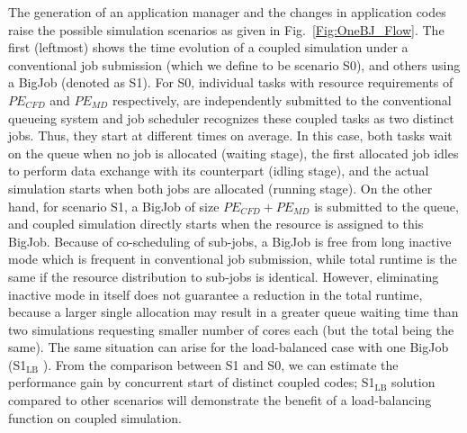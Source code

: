 \documentclass[preprint,12pt]{elsarticle}
\newcommand{\subscript}[1]{\ensuremath{_{\textrm{#1}}}}
\newcommand{\lb}[0]{\subscript{LB} }
\begin{document}
The generation of an application manager and the changes in application codes raise 
the possible simulation scenarios as given in Fig.~\ref{Fig:OneBJ_Flow}. 
The first (leftmost) shows the time evolution of a coupled simulation 
under a conventional job submission (which we define to be scenario S0), 
and others using a BigJob (denoted as S1). For S0, individual tasks 
with resource requirements of $PE_{CFD}$ and $PE_{MD}$ respectively, 
are independently submitted to the conventional queueing system and 
job scheduler recognizes these coupled tasks as two distinct jobs. 
Thus, they start at different times on average.
In this case, both tasks wait on the queue when no job is allocated (waiting stage), 
the first allocated job idles to perform data exchange with its counterpart (idling stage), 
and the actual simulation starts when both jobs are allocated (running stage). 
On the other hand, for scenario S1, a BigJob of size $PE_{CFD}+PE_{MD}$ is 
submitted to the queue, and coupled simulation directly starts when the resource is 
assigned to this BigJob. Because of co-scheduling of sub-jobs, a BigJob is free from 
long inactive mode which is frequent in conventional job submission, 
while total runtime is the same if the resource distribution to sub-jobs is identical. 
However, eliminating inactive mode in itself does not guarantee a reduction 
in the total runtime, because a larger single allocation may result in 
a greater queue waiting time than two simulations requesting smaller number of cores 
each (but the total being the same). The same situation can arise for the load-balanced case 
with one BigJob (S1\lb). From the comparison between S1 and S0, we can estimate 
the performance gain by concurrent start of distinct coupled codes; 
S1\lb solution compared to other scenarios will demonstrate the benefit of 
a load-balancing function on coupled simulation.
\end{document}
